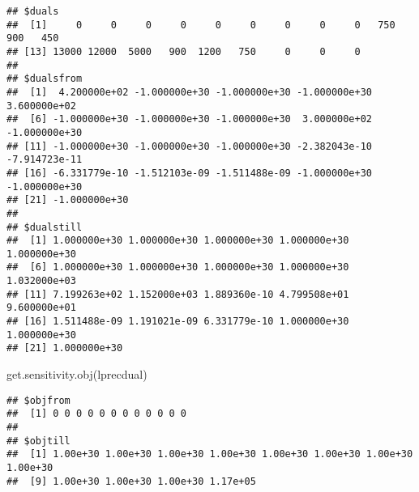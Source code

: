\documentclass[
]{article}
\newenvironment{Shaded}{\begin{snugshade}}{\end{snugshade}}
\newcommand{\FunctionTok}[1]{\textcolor[rgb]{0.00,0.00,0.00}{#1}}
\newcommand{\NormalTok}[1]{#1}
\begin{document}
\begin{verbatim}
## $duals
##  [1]     0     0     0     0     0     0     0     0     0   750   900   450
## [13] 13000 12000  5000   900  1200   750     0     0     0
## 
## $dualsfrom
##  [1]  4.200000e+02 -1.000000e+30 -1.000000e+30 -1.000000e+30  3.600000e+02
##  [6] -1.000000e+30 -1.000000e+30 -1.000000e+30  3.000000e+02 -1.000000e+30
## [11] -1.000000e+30 -1.000000e+30 -1.000000e+30 -2.382043e-10 -7.914723e-11
## [16] -6.331779e-10 -1.512103e-09 -1.511488e-09 -1.000000e+30 -1.000000e+30
## [21] -1.000000e+30
## 
## $dualstill
##  [1] 1.000000e+30 1.000000e+30 1.000000e+30 1.000000e+30 1.000000e+30
##  [6] 1.000000e+30 1.000000e+30 1.000000e+30 1.000000e+30 1.032000e+03
## [11] 7.199263e+02 1.152000e+03 1.889360e-10 4.799508e+01 9.600000e+01
## [16] 1.511488e-09 1.191021e-09 6.331779e-10 1.000000e+30 1.000000e+30
## [21] 1.000000e+30
\end{verbatim}

\begin{Shaded}
\begin{Highlighting}[]
\FunctionTok{get.sensitivity.obj}\NormalTok{(lprecdual)}
\end{Highlighting}
\end{Shaded}

\begin{verbatim}
## $objfrom
##  [1] 0 0 0 0 0 0 0 0 0 0 0 0
## 
## $objtill
##  [1] 1.00e+30 1.00e+30 1.00e+30 1.00e+30 1.00e+30 1.00e+30 1.00e+30 1.00e+30
##  [9] 1.00e+30 1.00e+30 1.00e+30 1.17e+05
\end{verbatim}
\end{document}
